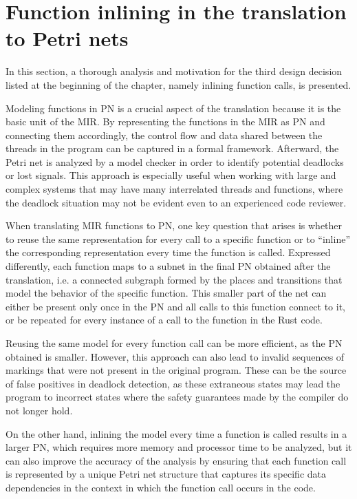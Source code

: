 \documentclass[../Thesis.tex]{subfiles}
\begin{document}
\section{Function inlining in the translation to Petri nets}

In this section, a thorough analysis and motivation for the third design decision
listed at the beginning of the chapter, namely inlining function calls, is presented.

Modeling functions in \acrshort{PN} is a crucial aspect of the translation
because it is the basic unit of the MIR.
By representing the functions in the MIR as \acrshort{PN} and connecting them accordingly,
the control flow and data shared between the threads in the program
can be captured in a formal framework.
Afterward, the Petri net is analyzed by a model checker
in order to identify potential deadlocks or lost signals.
This approach is especially useful when working with large and complex systems
that may have many interrelated threads and functions,
where the deadlock situation may not be evident even to an experienced code reviewer.

When translating MIR functions to \acrshort{PN}, one key question that arises is
whether to reuse the same representation for every call to a specific function or
to ``inline'' the corresponding representation every time the function is called.
Expressed differently, each function maps to a subnet
in the final \acrshort{PN} obtained after the translation, i.e.
a connected subgraph formed by the places and transitions
that model the behavior of the specific function.
This smaller part of the net can either be present only once in the \acrshort{PN}
and all calls to this function connect to it,
or be repeated for every instance of a call to the function in the Rust code.

Reusing the same model for every function call can be more efficient,
as the \acrshort{PN} obtained is smaller.
However, this approach can also lead to invalid sequences of markings
that were not present in the original program.
These can be the source of false positives in deadlock detection,
as these extraneous states may lead the program to
incorrect states where the safety guarantees made by the compiler do not longer hold.

On the other hand, inlining the model every time a function is called results in
a larger \acrshort{PN}, which requires more memory and processor time to be analyzed,
but it can also improve the accuracy of the analysis by ensuring
that each function call is represented by a unique Petri net structure
that captures its specific data dependencies in the context
in which the function call occurs in the code.
\end{document}
